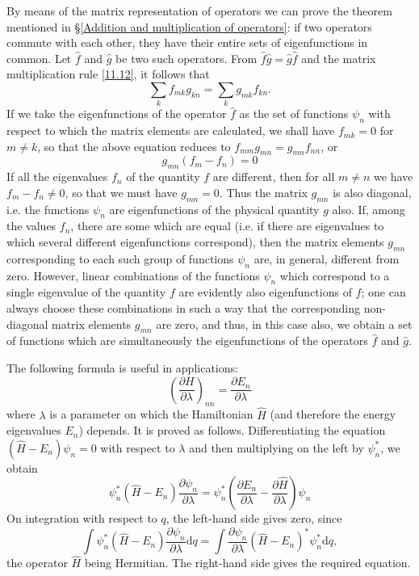 By means of the matrix representation of operators we can prove the theorem mentioned in \S\ref{Addition and multiplication of operators}: if two operators commute with each other, they have their entire sets of eigenfunctions in common. Let $\hat{f}$ and $\hat{g}$ be two such operators. From $ \hat{f}\hat{g}=\hat{g}\hat{f} $ and the matrix multiplication rule \eqref{11.12}, it follows that
\[ \sum_{k}f_{mk}g_{kn}=\sum_{k}g_{mk}f_{kn}. \]
If we take the eigenfunctions of the operator $ \hat{f} $ as the set of functions $\psi_n$ with respect to which the matrix elements are calculated, we shall have $ f_{mk}=0 $ for $ m\ne k $, so that the above equation reduces to $ f_{mm}g_{mn} =g_{mn}f_{nn} $, or
\[ g_{mn}(f_m-f_n)=0 \]
If all the eigenvalues $ f_n $ of the quantity $ f $ are different, then for all $ m\ne n $ we have $ f_m−f_n\ne 0 $, so that we must have $ g_{mn} = 0 $. Thus the matrix $ g_{mn} $ is also diagonal, i.e. the functions $ \psi_n $ are eigenfunctions of the physical quantity $ g $ also. If, among the values $ f_n $, there are some which are equal (i.e. if there are eigenvalues to which several different eigenfunctions correspond), then the matrix elements $ g_{mn} $ corresponding to each such group of functions $ \psi_n $ are, in general, different from zero. However, linear combinations of the functions $ \psi_n $ which correspond to a single eigenvalue of the quantity $ f $ are evidently also eigenfunctions of $ f $; one can always choose these combinations in such a way that the corresponding non-diagonal matrix elements $ g_{mn} $ are zero, and thus, in this case also, we obtain a set of functions which are simultaneously the eigenfunctions of the operators $\hat{f}$ and $\hat{g}$.

The following formula is useful in applications:
\begin{equation}\label{11.16}
\left( \frac{\partial H}{\partial\lambda}\right)_{nn}=\frac{\partial E_n}{\partial\lambda}
\end{equation}
where $ \lambda $ is a parameter on which the Hamiltonian $ \hat{H} $ (and therefore the energy eigenvalues $ E_n $) depends. It is proved as follows. Differentiating the equation $ (\hat{H}-E_n)\psi_n = 0 $ with respect to $ \lambda $ and then multiplying on the left by $ \psi_n^* $, we obtain
\[ \psi_n^*(\hat{H}-E_n)\frac{\partial\psi_n}{\partial\lambda}=\psi_n^*\left(\frac{\partial E_n}{\partial\lambda}-\frac{\partial\hat{H}}{\partial\lambda} \right)\psi_n \]
On integration with respect to $ q $, the left-hand side gives zero, since
\[ \int\psi_n^*(\hat{H}-E_n)\frac{\partial\psi_n}{\partial\lambda}\mathrm{d}q=\int\frac{\partial\psi_n}{\partial\lambda}(\hat{H}-E_n)^*\psi_n^*\mathrm{d}q, \]
the operator $ \hat{H} $ being Hermitian. The right-hand side gives the required equation.

